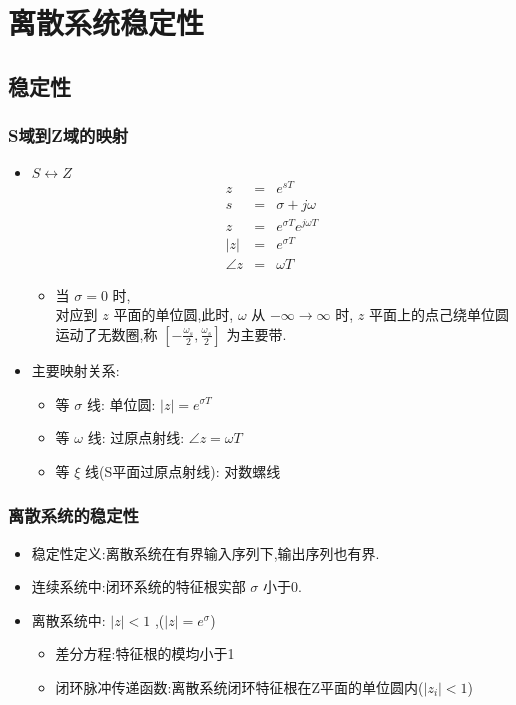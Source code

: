 \documentclass[table]{article}
\begin{document}
\section{离散系统稳定性}
\label{sec-5}
\subsection{稳定性}
\label{sec-5-1}
\begin{frame}
\frametitle{S域到Z域的映射}
\label{sec-5-1-1}
\begin{itemize}

\item $S\leftrightarrow Z$
\label{sec-5-1-1-1}%
\begin{eqnarray*}
z & = & e^{sT}\\
s &=& \sigma+j\omega \\
z &=& e^{\sigma T}e^{j\omega T} \\
|z| &=& e^{\sigma T} \\
\angle z &=& \omega T
\end{eqnarray*}
\begin{itemize}

\item 当  $\sigma=0$  时,\\
\label{sec-5-1-1-1-1}%
对应到  $z$  平面的单位圆,此时,  $\omega$  从  $-\infty\rightarrow\infty$ 时,  $z$  平面上的点己绕单位圆运动了无数圈,称  $[-\frac{\omega_s}{2},\frac{\omega_s}{2}]$  为主要带.

\end{itemize} %

\item 主要映射关系:
\label{sec-5-1-1-2}%
\begin{itemize}
\item 等  $\sigma$  线: 单位圆:   $|z|=e^{\sigma T}$
\item 等  $\omega$  线: 过原点射线:  $\angle z=\omega T$
\item 等  $\xi$  线(S平面过原点射线): 对数螺线
\end{itemize}

\end{itemize} %
\end{frame}
\begin{frame}
\frametitle{离散系统的稳定性}
\label{sec-5-1-2}

\begin{itemize}
\item 稳定性定义:离散系统在有界输入序列下,输出序列也有界.
\item <2->连续系统中:闭环系统的特征根实部 $\sigma$  小于0.
\item <3->离散系统中:  $|z|<1$ ,($|z|=e^{\sigma}$)
\begin{itemize}
\item 差分方程:特征根的模均小于1
\item 闭环脉冲传递函数:离散系统闭环特征根在Z平面的单位圆内($|z_i|<1$)
\end{itemize}
\end{itemize}
\end{frame}
\end{document}
